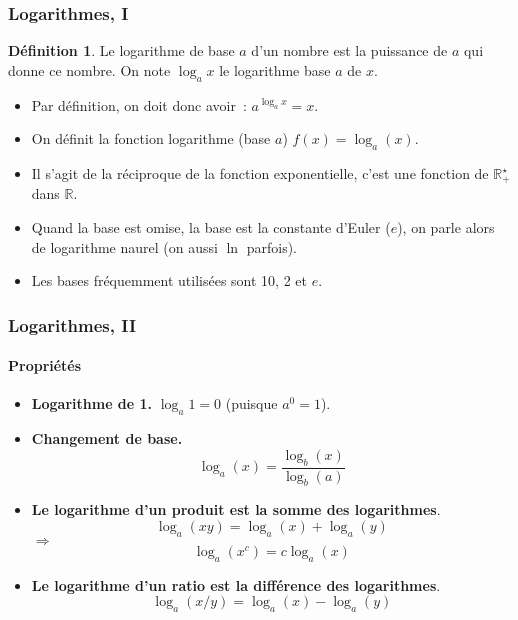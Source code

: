 \documentclass[10pt,notheorems]{beamer}
\theoremstyle{plain}
\theoremstyle{definition} %
\newtheorem{definition}{Définition}
\begin{document}
\begin{frame}
  \frametitle{Logarithmes, I}

  \begin{definition}
    Le logarithme de base $a$ d'un nombre est la puissance de $a$ qui donne ce nombre. On note $\log_a x$ le logarithme base $a$ de $x$.
  \end{definition}

  \bigskip

  \begin{itemize}

  \item Par définition, on doit donc avoir~: $a^{\log_a x} = x$.\newline

  \item On définit la fonction logarithme (base $a$) $f(x) = \log_a(x)$.\newline

  \item Il s'agit de la réciproque de la fonction exponentielle, c'est une fonction de $\mathbb R_+^{\star}$ dans $\mathbb R$.\newline

  \item Quand la base est omise, la base est la constante d'Euler ($e$), on parle alors de logarithme naurel (on aussi $\ln$ parfois).\newline

  \item Les bases fréquemment utilisées sont 10, 2 et $e$.

  \end{itemize}

\end{frame}


\begin{frame}
  \frametitle{Logarithmes, II}
  \framesubtitle{Propriétés}

  \bigskip

  \begin{itemize}

  \item \textbf{Logarithme de 1.} $\log_a 1 = 0$ (puisque $a^0 = 1$).\newline

  \item \textbf{Changement de base.}
    \[
      \log_a(x) = \frac{\log_b(x)}{\log_b(a)}
    \]

    \bigskip

  \item \textbf{Le logarithme d'un produit est la somme des logarithmes}.
    \[
      \log_a(xy) = \log_a(x)+\log_a(y)
    \]
    $\Rightarrow$
    \[
      \log_a \left(x^c\right) = c \log_a (x)
    \]

    \bigskip

  \item \textbf{Le logarithme d'un ratio est la différence des logarithmes}.
    \[
      \log_a(x/y) = \log_a(x)-\log_a(y)
    \]


  \end{itemize}

\end{frame}
\end{document}
